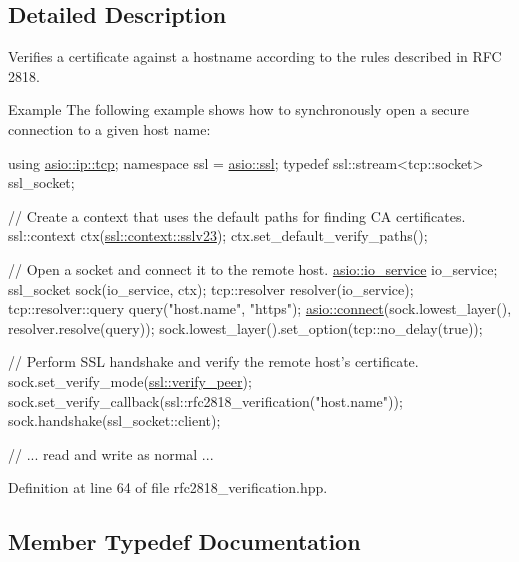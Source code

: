 \subsection{Detailed Description}
Verifies a certificate against a hostname according to the rules described in R\+F\+C 2818. \begin{DoxyParagraph}{Example}
The following example shows how to synchronously open a secure connection to a given host name\+: 
\begin{DoxyCode}
\textcolor{keyword}{using} \hyperlink{classasio_1_1ip_1_1tcp}{asio::ip::tcp};
\textcolor{keyword}{namespace }ssl = \hyperlink{namespaceasio_1_1ssl}{asio::ssl};
\textcolor{keyword}{typedef} ssl::stream<tcp::socket> ssl\_socket;

\textcolor{comment}{// Create a context that uses the default paths for finding CA certificates.}
ssl::context ctx(\hyperlink{classasio_1_1ssl_1_1context__base_ac37d498266e3b13607f011ace6417525ae478c3ede58b50c99d6c6ff9ed7c0124}{ssl::context::sslv23});
ctx.set\_default\_verify\_paths();

\textcolor{comment}{// Open a socket and connect it to the remote host.}
\hyperlink{classasio_1_1io__service}{asio::io\_service} io\_service;
ssl\_socket sock(io\_service, ctx);
tcp::resolver resolver(io\_service);
tcp::resolver::query query(\textcolor{stringliteral}{"host.name"}, \textcolor{stringliteral}{"https"});
\hyperlink{group__connect_ga29acd61d7a875cef7dbd1f892be2906c}{asio::connect}(sock.lowest\_layer(), resolver.resolve(query));
sock.lowest\_layer().set\_option(tcp::no\_delay(\textcolor{keyword}{true}));

\textcolor{comment}{// Perform SSL handshake and verify the remote host's certificate.}
sock.set\_verify\_mode(\hyperlink{namespaceasio_1_1ssl_ae71141f1eff86b35a2a2491501d55926}{ssl::verify\_peer});
sock.set\_verify\_callback(ssl::rfc2818\_verification(\textcolor{stringliteral}{"host.name"}));
sock.handshake(ssl\_socket::client);

\textcolor{comment}{// ... read and write as normal ...}
\end{DoxyCode}
 
\end{DoxyParagraph}


Definition at line 64 of file rfc2818\+\_\+verification.\+hpp.



\subsection{Member Typedef Documentation}
\hypertarget{classasio_1_1ssl_1_1rfc2818__verification_a793767089e5bc88c7c28ed182e9cba02}{}
